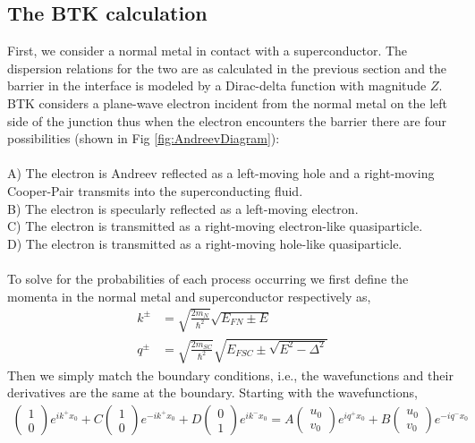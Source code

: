 \subsection{The \ac{BTK} calculation}
First, we consider a normal metal in contact with a superconductor. The dispersion relations for the two are as calculated in the previous section and the barrier in the interface is modeled by a Dirac-delta function with magnitude $Z$. \ac{BTK} considers a plane-wave electron incident from the normal metal on the left side of the junction thus when the electron encounters the barrier there are four possibilities (shown in Fig \ref{fig:AndreevDiagram}):\\
\\
A) The electron is Andreev reflected as a left-moving hole and a right-moving Cooper-Pair transmits into the superconducting fluid.\\
B) The electron is specularly reflected as a left-moving electron.\\
C) The electron is transmitted as a right-moving electron-like quasiparticle.\\
D) The electron is transmitted as a right-moving hole-like quasiparticle.\\
\\
To solve for the probabilities of each process occurring we first define the momenta in the normal metal and superconductor respectively as,
\begin{align}
    k^{\pm} &= \sqrt{\frac{2m_N}{\hbar^{2}}}\sqrt{E_{FN}\pm E}\\
    q^{\pm} &= \sqrt{\frac{2m_{SC}}{\hbar^{2}}}\sqrt{E_{FSC}\pm\sqrt{E^{2}-\Delta^{2}}}
\end{align}
Then we simply match the boundary conditions, i.e., the wavefunctions and their derivatives are the same at the boundary. Starting with the wavefunctions,
\begin{align}
    \begin{pmatrix}1\\0\end{pmatrix}e^{ik^{+}x_{0}}
    + C\begin{pmatrix}1\\0\end{pmatrix}e^{-ik^{+}x_{0}}
    + D\begin{pmatrix}0\\1\end{pmatrix}e^{ik^{-}x_{0}}
    =
    A\begin{pmatrix}u_{0}\\v_{0}\end{pmatrix}e^{iq^{+}x_{0}}
    + B\begin{pmatrix}u_{0}\\v_{0}\end{pmatrix}e^{-iq^{-}x_{0}}
\end{align}
